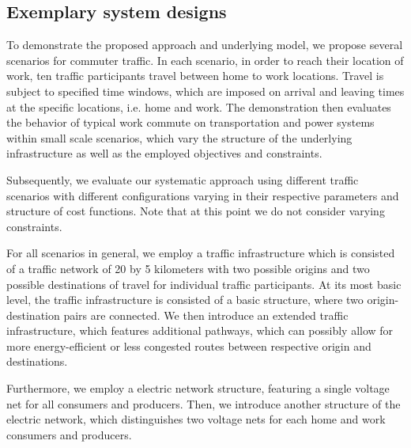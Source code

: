 \subsection{Exemplary system designs}
\label{examples}

To demonstrate the proposed approach and underlying model, we propose several scenarios for commuter traffic. In each scenario, in order to reach their location of work, ten traffic participants travel between home to work locations. Travel is subject to specified time windows, which are imposed on arrival and leaving times at the specific locations, i.e. home and work. The demonstration then evaluates the behavior of typical work commute on transportation and power systems within small scale scenarios, which vary the structure of the underlying infrastructure as well as the employed objectives and constraints.

Subsequently, we evaluate our systematic approach using different traffic scenarios with different configurations varying in their respective parameters and structure of cost functions. Note that at this point we do not consider varying constraints. 


For all scenarios in general, we employ a traffic infrastructure which is consisted of a traffic network of 20 by 5 kilometers with two possible origins and two possible destinations of travel for individual traffic participants. At its most basic level, the traffic infrastructure is consisted of a basic structure, where two origin-destination pairs are connected. We then introduce an extended traffic infrastructure, which features additional pathways, which can possibly allow for more energy-efficient or less congested routes between respective origin and destinations.

Furthermore, we employ a electric network structure, featuring a single voltage net for all consumers and producers. Then, we introduce another structure of the electric network, which distinguishes two voltage nets for each home and work consumers and producers.



